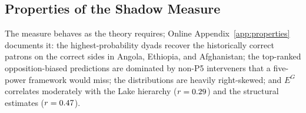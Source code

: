 \subsection{Properties of the Shadow Measure}
\label{sec:shadow-properties}

The measure behaves as the theory requires; Online
Appendix~\ref{app:properties} documents it: the
highest-probability dyads recover the historically correct patrons on the
correct sides in Angola, Ethiopia, and Afghanistan; the top-ranked
opposition-biased predictions are dominated by non-P5 interveners that a
five-power framework would miss; the distributions are heavily right-skewed;
and $E^G$ correlates moderately with the Lake hierarchy ($r = 0.29$)
and the \citet{gibilisco2022} structural estimates ($r = 0.47$).
